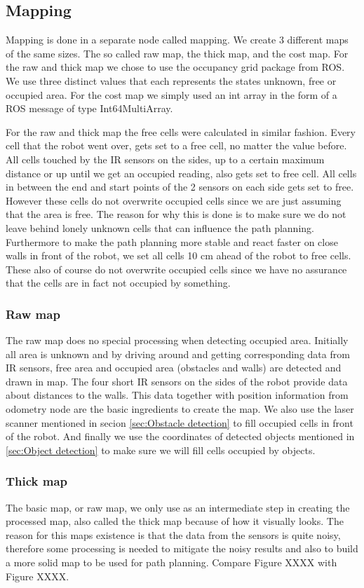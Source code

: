 \subsection{Mapping}
Mapping is done in a separate node called mapping. We create 3 different maps of the same sizes. The so called raw map, the thick map, and the cost map. For the raw and thick map we chose to use the occupancy grid package from ROS. We use three distinct values that each represents the states unknown, free or occupied area. For the cost map we simply used an int array in the form of a ROS message of type Int64MultiArray.

For the raw and thick map the free cells were calculated in similar fashion. Every cell that the robot went over, gets set to a free cell, no matter the value before. All cells touched by the IR sensors on the sides, up to a certain maximum distance or up until we get an occupied reading, also gets set to free cell. All cells in between the end and start points of the 2 sensors on each side gets set to free. However these cells do not overwrite occupied cells since we are just assuming that the area is free. The reason for why this is done is to make sure we do not leave behind lonely unknown cells that can influence the path planning. Furthermore to make the path planning more stable and react faster on close walls in front of the robot, we set all cells 10 cm ahead of the robot to free cells. These also of course do not overwrite occupied cells since we have no assurance that the cells are in fact not occupied by something. 

\subsubsection{Raw map}
The raw map does no special processing when detecting occupied area. Initially all area is unknown and by driving around and getting corresponding data from IR sensors, free area and occupied area (obstacles and walls) are detected and drawn in map. The four short IR sensors on the sides of the robot provide data about distances to the walls. This data together with position information from odometry node are the basic ingredients to create the map.
We also use the laser scanner mentioned in secion \ref{sec:Obstacle detection} to fill occupied cells in front of the robot. And finally we use the coordinates of detected objects mentioned in \ref{sec:Object detection} to make sure we will fill cells occupied by objects.

\subsubsection{Thick map}
The basic map, or raw map, we only use as an intermediate step in creating the processed map, also called the thick map because of how it visually looks. The reason for this maps existence is that the data from the sensors is quite noisy, therefore some processing is needed to mitigate the noisy results and also to build a more solid map to be used for path planning. Compare Figure XXXX with Figure XXXX.


